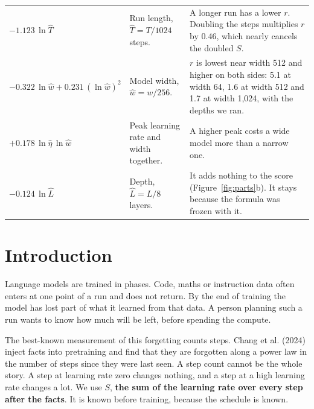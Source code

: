 \documentclass{article}
\newcommand{\rowline}{\arrayrulecolor{black!25}\specialrule{0.3pt}{2.5pt}{2.5pt}\arrayrulecolor{black}}
\newcommand{\he}{\hat{\eta}}
\newcommand{\hT}{\hat{T}}
\newcommand{\hw}{\hat{w}}
\newcommand{\hL}{\hat{L}}
\begin{document}
\begin{table}[t]
\begin{tabularx}{\textwidth}{@{}l >{\hsize=0.92\hsize}X >{\hsize=1.08\hsize}X@{}}
\rowline
$-1.123\,\ln\hT$ & Run length, $\hT = T/1024$ steps. & A longer run has a lower $r$. Doubling the steps multiplies $r$ by 0.46, which nearly cancels the doubled $S$. \\
\rowline
$-0.322\,\ln\hw + 0.231\,(\ln\hw)^2$ & Model width, $\hw = w/256$. & $r$ is lowest near width 512 and higher on both sides: 5.1 at width 64, 1.6 at width 512 and 1.7 at width 1,024, with the depths we ran. \\
\rowline
$+0.178\,\ln\he\,\ln\hw$ & Peak learning rate and width together. & A higher peak costs a wide model more than a narrow one. \\
\rowline
$-0.124\,\ln\hL$ & Depth, $\hL = L/8$ layers. & It adds nothing to the score (Figure~\ref{fig:parts}b). It stays because the formula was frozen with it. \\
\bottomrule
\end{tabularx}
\end{table}

\section{Introduction}

Language models are trained in phases. Code, maths or instruction data often enters at one point of a run and does not return. By the end of training the model has lost part of what it learned from that data. A person planning such a run wants to know how much will be left, before spending the compute.

The best-known measurement of this forgetting counts steps. Chang et al. (2024) inject facts into pretraining and find that they are forgotten along a power law in the number of steps since they were last seen. A step count cannot be the whole story. A step at learning rate zero changes nothing, and a step at a high learning rate changes a lot. We use $S$, \textbf{the sum of the learning rate over every step after the facts}. It is known before training, because the schedule is known.
\end{document}
